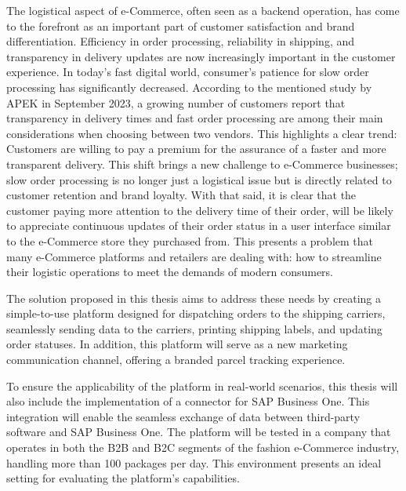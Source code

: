 The logistical aspect of e-Commerce, often seen as a backend operation, has come to the forefront as an important part of customer satisfaction and brand differentiation.
Efficiency in order processing, reliability in shipping, and transparency in delivery updates are now increasingly important in the customer experience.
In today's fast digital world, consumer's patience for slow order processing has significantly decreased.
According to the mentioned study by \ac{APEK} in September 2023, a growing number of customers report that transparency in delivery times and fast order processing are among their main considerations when choosing between two vendors.
This highlights a clear trend: Customers are willing to pay a premium for the assurance of a faster and more transparent delivery.
This shift brings a new challenge to e-Commerce businesses; slow order processing is no longer just a logistical issue but is directly related to customer retention and brand loyalty.
With that said, it is clear that the customer paying more attention to the delivery time of their order, will be likely to appreciate continuous updates of their order status in a user interface similar to the e-Commerce store they purchased from.
This presents a problem that many e-Commerce platforms and retailers are dealing with: how to streamline their logistic operations to meet the demands of modern consumers.

The solution proposed in this thesis aims to address these needs by creating a simple-to-use platform designed for dispatching orders to the shipping carriers, seamlessly sending data to the carriers, printing shipping labels, and updating order statuses.
In addition, this platform will serve as a new marketing communication channel, offering a branded parcel tracking experience.

To ensure the applicability of the platform in real-world scenarios, this thesis will also include the implementation of a connector for SAP Business One. This integration will enable the seamless exchange of data between third-party software and SAP Business One. The platform will be tested in a company that operates in both the \ac{B2B} and \ac{B2C} segments of the fashion e-Commerce industry, handling more than 100 packages per day. 
This environment presents an ideal setting for evaluating the platform's capabilities.


